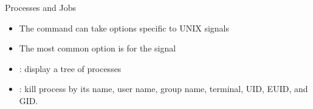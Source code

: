 \documentclass[10pt,t]{beamer}
\begin{document}
\begin{frame}{\small Processes and Jobs}
\begin{itemize}
    \item The  command can take options specific to UNIX signals
    \item The most common option is  for the  signal
    \item {}: display a tree of processes
    \item {}: kill process by its name, user name, group name, terminal, UID, EUID, and GID.
  \end{itemize}
\end{frame}
\end{document}
